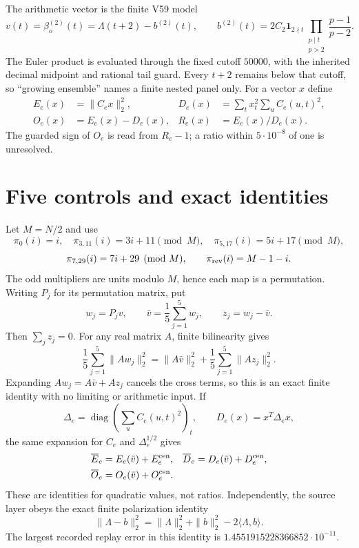\documentclass[10pt]{article}
\newcommand{\ind}{\mathbf 1}
\begin{document}
The arithmetic vector is the finite V59 model
\begin{equation}\label{eq:source}
 v(t)=\beta_o^{(2)}(t)=\Lambda(t+2)-b^{(2)}(t),\qquad
 b^{(2)}(t)=2C_2\ind_{2\nmid t}
 \prod_{\substack{p\mid t\\p>2}}\frac{p-1}{p-2}.
\end{equation}
The Euler product is evaluated through the fixed cutoff $50000$, with the
inherited decimal midpoint and rational tail guard.  Every $t+2$ remains
below that cutoff, so ``growing ensemble'' names a finite nested panel only.
For a vector $x$ define
\begin{align}
 E_e(x)&=\|C_ex\|_2^2, &D_e(x)&=\sum_t x_t^2\sum_u C_e(u,t)^2,\\
 O_e(x)&=E_e(x)-D_e(x), &R_e(x)&=E_e(x)/D_e(x).
\label{eq:metrics}
\end{align}
The guarded sign of $O_e$ is read from $R_e-1$; a ratio within
$5\cdot10^{-8}$ of one is unresolved.

\section{Five controls and exact identities}
Let $M=N/2$ and use
\[
 \pi_0(i)=i,\quad \pi_{3,11}(i)=3i+11\pmod M,\quad
 \pi_{5,17}(i)=5i+17\pmod M,
\]
\[
 \pi_{7,29}(i)=7i+29\pmod M,\qquad \pi_{\rm rev}(i)=M-1-i.
\]
The odd multipliers are units modulo $M$, hence each map is a permutation.
Writing $P_j$ for its permutation matrix, put
\[
 w_j=P_jv,\qquad \bar v=\frac15\sum_{j=1}^5w_j,
 \qquad z_j=w_j-\bar v.
\]
Then $\sum_jz_j=0$.  For any real matrix $A$, finite bilinearity gives
\begin{equation}\label{eq:quad}
 \frac15\sum_{j=1}^5\|Aw_j\|_2^2
 =\|A\bar v\|_2^2+\frac15\sum_{j=1}^5\|Az_j\|_2^2.
\end{equation}
Expanding $Aw_j=A\bar v+Az_j$ cancels the cross terms, so this is an exact
finite identity with no limiting or arithmetic input.  If
\[
 \Delta_e=\operatorname{diag}\left(\sum_uC_e(u,t)^2\right)_t,
 \qquad D_e(x)=x^T\Delta_ex,
\]
the same expansion for $C_e$ and $\Delta_e^{1/2}$ gives
\begin{align}
 \overline E_e&=E_e(\bar v)+E_e^{\rm cen},
 &\overline D_e&=D_e(\bar v)+D_e^{\rm cen},\\
 \overline O_e&=O_e(\bar v)+O_e^{\rm cen}.
 \label{eq:three}
\end{align}
These are identities for quadratic values, not ratios.  Independently, the
source layer obeys the exact finite polarization identity
\begin{equation}\label{eq:polar}
 \|\Lambda-b\|_2^2=\|\Lambda\|_2^2+\|b\|_2^2-2\langle\Lambda,b\rangle.
\end{equation}
The largest recorded replay error in this identity is
$1.4551915228366852\cdot10^{-11}$.
\end{document}
